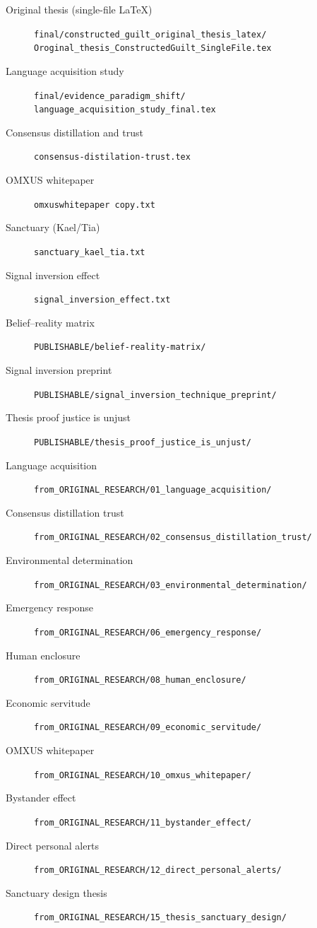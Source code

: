 \documentclass[11pt,a4paper,openright]{book}
\begin{document}
\begin{description}
\item[Original thesis (single-file LaTeX)] \texttt{final/constructed\_guilt\_original\_thesis\_latex/} \texttt{Oroginal\_thesis\_ConstructedGuilt\_SingleFile.tex}
\item[Language acquisition study] \texttt{final/evidence\_paradigm\_shift/} \texttt{language\_acquisition\_study\_final.tex}
\item[Consensus distillation and trust] \texttt{consensus-distilation-trust.tex}
\item[OMXUS whitepaper] \texttt{omxuswhitepaper copy.txt}
\item[Sanctuary (Kael/Tia)] \texttt{sanctuary\_kael\_tia.txt}
\item[Signal inversion effect] \texttt{signal\_inversion\_effect.txt}
\item[Belief--reality matrix] \texttt{PUBLISHABLE/belief-reality-matrix/}
\item[Signal inversion preprint] \texttt{PUBLISHABLE/signal\_inversion\_technique\_preprint/}
\item[Thesis proof justice is unjust] \texttt{PUBLISHABLE/thesis\_proof\_justice\_is\_unjust/}
\item[Language acquisition] \texttt{from\_ORIGINAL\_RESEARCH/01\_language\_acquisition/}
\item[Consensus distillation trust] \texttt{from\_ORIGINAL\_RESEARCH/02\_consensus\_distillation\_trust/}
\item[Environmental determination] \texttt{from\_ORIGINAL\_RESEARCH/03\_environmental\_determination/}
\item[Emergency response] \texttt{from\_ORIGINAL\_RESEARCH/06\_emergency\_response/}
\item[Human enclosure] \texttt{from\_ORIGINAL\_RESEARCH/08\_human\_enclosure/}
\item[Economic servitude] \texttt{from\_ORIGINAL\_RESEARCH/09\_economic\_servitude/}
\item[OMXUS whitepaper] \texttt{from\_ORIGINAL\_RESEARCH/10\_omxus\_whitepaper/}
\item[Bystander effect] \texttt{from\_ORIGINAL\_RESEARCH/11\_bystander\_effect/}
\item[Direct personal alerts] \texttt{from\_ORIGINAL\_RESEARCH/12\_direct\_personal\_alerts/}
\item[Sanctuary design thesis] \texttt{from\_ORIGINAL\_RESEARCH/15\_thesis\_sanctuary\_design/}
\end{description}

\cleardoublepage
\printindex
\end{document}
